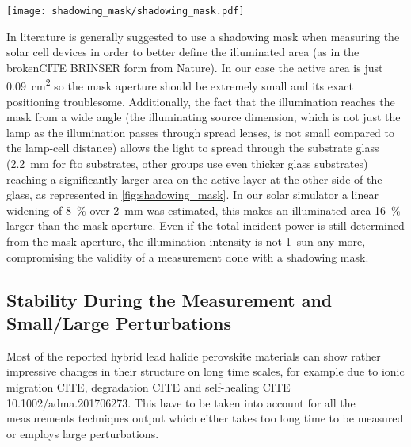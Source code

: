 		\begin{SCfigure}
			\centering
			\texttt{[image: shadowing\_mask/shadowing\_mask.pdf]}
			\label{fig:shadowing_mask}
		\end{SCfigure}

		In literature is generally suggested to use a shadowing mask when measuring the solar cell devices in order to better define the illuminated area (as in the brokenCITE BRINSER form from Nature\cite{NatureResearch2017}). %
		In our case the active area is just \SI{0.09}{\square\cm} so the mask aperture should be extremely small and its exact positioning troublesome. Additionally, the fact that the illumination reaches the mask from a wide angle (the illuminating source dimension, which is not just the lamp as the illumination passes through spread lenses, is not small compared to the lamp-cell distance) allows the light to spread through the substrate glass (\SI{2.2}{\mm} for \gls{fto} substrates, other groups use even thicker glass substrates) reaching a significantly larger area on the active layer at the other side of the glass, as represented in \cref{fig:shadowing_mask}. In our solar simulator a linear widening of 8~\% over \SI{2}{\mm} was estimated, this makes an illuminated area 16~\% larger than the mask aperture. Even if the total incident power is still determined from the mask aperture, the illumination intensity is not 1~sun any more, compromising the validity of a measurement done with a shadowing mask.


	\subsection{Stability During the Measurement and Small/Large Perturbations}

		Most of the reported hybrid lead halide perovskite materials can show rather impressive changes in their structure on long time scales, for example due to ionic migration CITE, degradation CITE and self-healing CITE 10.1002/adma.201706273.
		This have to be taken into account for all the measurements techniques output which either takes too long time to be measured or employs large perturbations.

